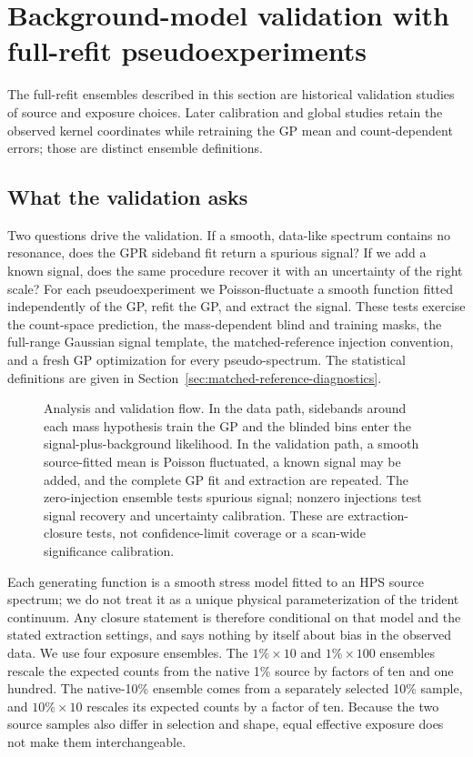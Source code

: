 
\section{Background-model validation with full-refit pseudoexperiments}
\label{sec:toys}

The full-refit ensembles described in this section are historical validation
studies of source and exposure choices. Later calibration and global studies
retain the observed kernel coordinates while retraining the GP mean and
count-dependent errors; those are distinct ensemble definitions.

\subsection{What the validation asks}

Two questions drive the validation. If a smooth, data-like spectrum contains no
resonance, does the GPR sideband fit return a spurious signal? If we add a known
signal, does the same procedure recover it with an uncertainty of the right scale?
For each pseudoexperiment we Poisson-fluctuate a smooth function fitted independently
of the GP, refit the GP, and extract the signal. These tests exercise the count-space prediction,
the mass-dependent blind and training masks, the full-range Gaussian signal
template, the matched-reference injection convention, and a fresh GP optimization
for every pseudo-spectrum. The statistical definitions are given in
Section~\ref{sec:matched-reference-diagnostics}.

\begin{figure}[htbp]
\centering
{}
\caption{Analysis and validation flow.  In the data path, sidebands around each mass
hypothesis train the GP and the blinded bins enter the signal-plus-background
likelihood.  In the validation path, a smooth source-fitted mean is Poisson
fluctuated, a known signal may be added, and the complete GP fit and extraction are
repeated.  The zero-injection ensemble tests spurious signal; nonzero injections test
signal recovery and uncertainty calibration.  These are extraction-closure tests,
not confidence-limit coverage or a scan-wide significance calibration.}
\label{fig:v491-hps-gpr-flowchart}
\end{figure}

Each generating function is a smooth stress model fitted to an HPS source spectrum;
we do not treat it as a unique physical parameterization of the trident continuum.
Any closure statement is therefore conditional on that model and the stated
extraction settings, and says nothing by itself about bias in the observed data. We
use four exposure ensembles. The
$1\%\times10$ and $1\%\times100$ ensembles rescale the expected counts from the native
1\% source by factors of ten and one hundred. The native-10\% ensemble comes from a
separately selected 10\% sample, and $10\%\times10$ rescales its expected counts by a
factor of ten. Because the two source samples also differ in selection and shape, equal
effective exposure does not make them interchangeable.

